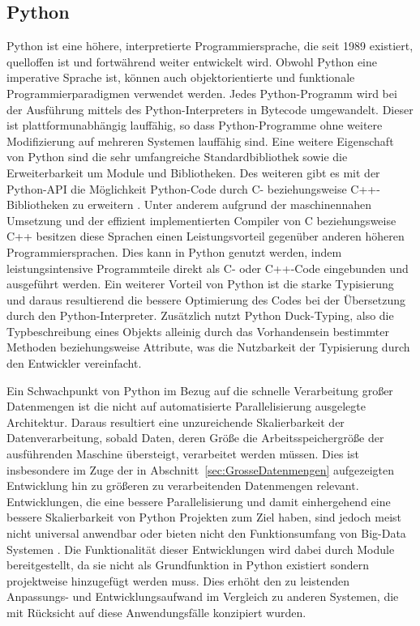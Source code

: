 \subsection{Python}
\label{sec:Python}
Python ist eine höhere, interpretierte Programmiersprache, die seit 1989 existiert, quelloffen ist und fortwährend weiter entwickelt wird. Obwohl Python eine imperative Sprache ist, können auch objektorientierte und funktionale Programmierparadigmen verwendet werden. Jedes Python-Programm wird bei der Ausführung mittels des Python-Interpreters in Bytecode umgewandelt. Dieser ist plattformunabhängig lauffähig, so dass Python-Programme ohne weitere Modifizierung auf mehreren Systemen lauffähig sind. Eine weitere Eigenschaft von Python sind die sehr umfangreiche Standardbibliothek sowie die Erweiterbarkeit um Module und Bibliotheken. Des weiteren gibt es mit der Python-API die Möglichkeit Python-Code durch C- beziehungsweise C++-Bibliotheken zu erweitern \cite{Martelli2006}. Unter anderem aufgrund der maschinennahen Umsetzung und der effizient implementierten Compiler von C beziehungsweise C++ besitzen diese Sprachen einen Leistungsvorteil gegenüber anderen höheren Programmiersprachen. Dies kann in Python genutzt werden, indem leistungsintensive Programmteile direkt als C- oder C++-Code eingebunden und ausgeführt werden. Ein weiterer Vorteil von Python ist die starke Typisierung und daraus resultierend die bessere Optimierung des Codes bei der Übersetzung durch den Python-Interpreter. Zusätzlich nutzt Python Duck-Typing, also die Typbeschreibung eines Objekts alleinig durch das Vorhandensein bestimmter Methoden beziehungsweise Attribute, was die Nutzbarkeit der Typisierung durch den Entwickler vereinfacht.

Ein Schwachpunkt von Python im Bezug auf die schnelle Verarbeitung großer Datenmengen ist die nicht auf automatisierte Parallelisierung ausgelegte Architektur. Daraus resultiert eine unzureichende Skalierbarkeit der Datenverarbeitung, sobald Daten, deren Größe die Arbeitsspeichergröße der ausführenden Maschine übersteigt, verarbeitet werden müssen. Dies ist insbesondere im Zuge der in Abschnitt~\ref{sec:GrosseDatenmengen} aufgezeigten Entwicklung hin zu größeren zu verarbeitenden Datenmengen relevant. Entwicklungen, die eine bessere Parallelisierung und damit einhergehend eine bessere Skalierbarkeit von Python Projekten zum Ziel haben, sind jedoch meist nicht universal anwendbar oder bieten nicht den Funktionsumfang von Big-Data Systemen \cite{ParallelPythonWebsite, DispyWebsite}. Die Funktionalität dieser Entwicklungen wird dabei durch Module bereitgestellt, da sie nicht als Grundfunktion in Python existiert sondern projektweise hinzugefügt werden muss. Dies erhöht den zu leistenden Anpassungs- und Entwicklungsaufwand im Vergleich zu anderen Systemen, die mit Rücksicht auf diese Anwendungsfälle konzipiert wurden.

